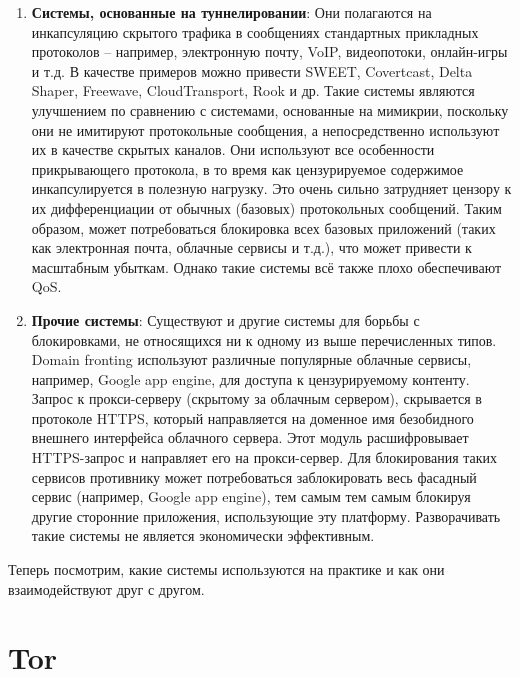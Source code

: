 \begin{enumerate}
    \item \textbf{Системы, основанные на туннелировании}:
    Они полагаются на инкапсуляцию скрытого трафика в сообщениях стандартных прикладных протоколов – например, электронную почту, VoIP, видеопотоки, онлайн-игры и т.д.
    В качестве примеров можно привести SWEET, Covertcast, Delta Shaper, Freewave, CloudTransport, Rook и др.
    Такие системы являются улучшением по сравнению с системами, основанные на мимикрии, поскольку они не имитируют протокольные сообщения,
    а непосредственно используют их в качестве скрытых каналов.
    Они используют все особенности прикрывающего протокола, в то время как цензурируемое содержимое инкапсулируется в полезную нагрузку.
    Это очень сильно затрудняет цензору к их дифференциации от обычных (базовых) протокольных сообщений.
    Таким образом, может потребоваться блокировка всех базовых приложений (таких как электронная почта, облачные сервисы и т.д.), что может привести к масштабным убыткам.
    Однако такие системы всё также плохо обеспечивают QoS.

    \item \textbf{Прочие системы}:
    Существуют и другие системы для борьбы с блокировками, не относящихся ни к одному из выше перечисленных типов.
    Domain fronting  используют различные популярные облачные сервисы, например, Google app engine, для доступа к цензурируемому контенту.
    Запрос к прокси-серверу (скрытому за облачным сервером), скрывается в протоколе HTTPS, который направляется на доменное имя безобидного внешнего интерфейса облачного сервера.
    Этот модуль расшифровывает HTTPS-запрос и направляет его на прокси-сервер.
    Для блокирования таких сервисов противнику может потребоваться заблокировать весь фасадный сервис (например, Google app engine), тем самым
    тем самым блокируя другие сторонние приложения, использующие эту платформу. Разворачивать такие системы не является экономически эффективным.


\end{enumerate}

Теперь посмотрим, какие системы используются на практике и как они взаимодействуют друг с другом.

\section{Tor}

